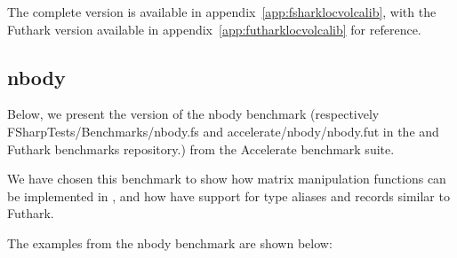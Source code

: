 The complete \fshark{} version is available in
appendix~\ref{app:fsharklocvolcalib}, with the Futhark version available in
appendix~\ref{app:futharklocvolcalib} for reference.

\subsection{nbody}
Below, we present the \fshark{} version of the nbody benchmark (respectively
FSharpTests/Benchmarks/nbody.fs and accelerate/nbody/nbody.fut in the
\fshark{} and Futhark benchmarks repository.) from the Accelerate\cite{finpar}
benchmark suite.

We have chosen this benchmark to show how matrix manipulation functions can be
implemented in \fshark{}, and how \fshark{} have support for type aliases and
records similar to Futhark.

The examples from the nbody benchmark are shown below:

